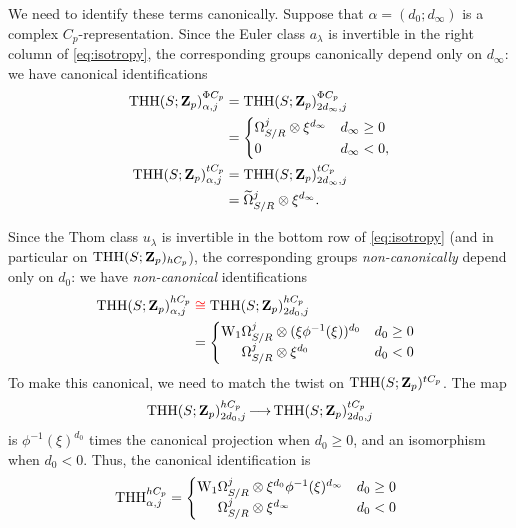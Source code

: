 \begin{method}
  We need to identify these terms canonically. Suppose that $\alpha=(d_0;d_\infty)$ is a complex $C_p$-representation. Since the Euler class $a_\lambda$ is invertible in the right column of \eqref{eq:isotropy}, the corresponding groups canonically depend only on $d_\infty$: we have canonical identifications
  \begin{align*}
    \mathrm{THH}(S;\mathbf Z_p)^{\Phi C_p}_{\alpha,j} &= \mathrm{THH}(S;\mathbf Z_p)^{\Phi C_p}_{2d_\infty,j}\\
                               &= \begin{cases}
                                 \Omega^j_{S/R} \otimes \xi^{d_\infty} & d_\infty \ge 0\\
                                 0 & d_\infty < 0,
                               \end{cases}\\
    \mathrm{THH}(S;\mathbf Z_p)^{tC_p}_{\alpha,j} &= \mathrm{THH}(S;\mathbf Z_p)^{t C_p}_{2d_\infty,j} \\
                           &= \widetilde{\Omega}^j_{S/R} \otimes \xi^{d_\infty}.
  \end{align*}
  
  Since the Thom class $u_\lambda$ is invertible in the bottom row of \eqref{eq:isotropy} (and in particular on $\mathrm{THH}(S;\mathbf Z_p)_{hC_p}$), the corresponding groups \emph{non-canonically} depend only on $d_0$: we have \emph{non-canonical} identifications
  \begin{align*}
    \thh^{hC_p}_{\alpha,j} &\mathrel{\red\isom} \thh^{hC_p}_{2d_0,j}\\
                           &= \left\{\!\!\!
                             \begin{array}{r@{}ll}
                               \dRW[1]^j_{S/R} &{}\tnsr (\xi\phi^{-1}(\xi))^{d_0} & d_0\ge0\\
                               \Omega^j_{S/R} &{}\tnsr \xi^{d_0} & d_0<0
                           \end{array}\right.
  \end{align*}
  To make this canonical, we need to match the twist on $\mathrm{THH}(S;\mathbf Z_p)^{tC_p}$. The map
  \[ \mathrm{THH}(S;\mathbf Z_p)^{hC_p}_{2d_0,j} \mathop{\longrightarrow}\limits \mathrm{THH}(S;\mathbf Z_p)^{tC_p}_{2d_0,j} \]
  is $\phi^{-1}(\xi)^{d_0}$ times the canonical projection when $d_0\ge 0$, and an isomorphism when $d_0<0$. Thus, the canonical identification is
  \[
    \THH^{hC_p}_{\alpha,j} =
    \left\{\!\!\!
      \begin{array}{r@{}ll}
        \dRW[1]^j_{S/R} &{}\tnsr \xi^{d_0} \phi^{-1}(\xi)^{d_\infty} & d_0\ge 0\\
        \Omega^j_{S/R} &{}\tnsr \xi^{d_\infty} & d_0 < 0
    \end{array}
    \right.
  \]


\end{method}
